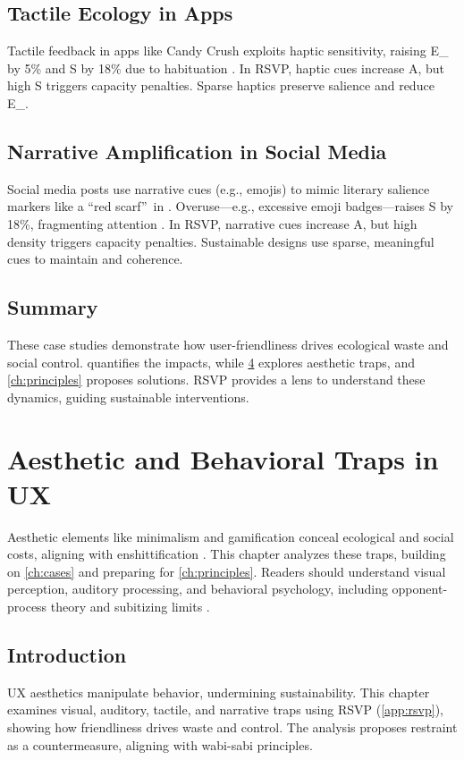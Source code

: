 \documentclass[openany]{book}
\newcommand{\PhiS}{\Phi} %
\newcommand{\Sent}{S} %
\newcommand{\Eint}{E_{\mathrm{int}}} %
\begin{document}
\section{Tactile Ecology in Apps}
\label{sec:cases-tactile}
Tactile feedback in apps like Candy Crush exploits haptic sensitivity, raising \Eint{} by 5\% and \Sent{} by 18\% due to habituation \citep{gallace2006}. In RSVP, haptic cues increase A, but high \Sent{} triggers capacity penalties. Sparse haptics preserve salience and reduce \Eint{}.

\section{Narrative Amplification in Social Media}
\label{sec:cases-narrative}
Social media posts use narrative cues (e.g., emojis) to mimic literary salience markers like a \textquotedblleft red scarf\textquotedblright\ in \citet{lewis1942}. Overuse---e.g., excessive emoji badges---raises \Sent{} by 18\%, fragmenting attention \citep{colak2024}. In RSVP, narrative cues increase A, but high density triggers capacity penalties. Sustainable designs use sparse, meaningful cues to maintain \PhiS{} and coherence.

\section{Summary}
These case studies demonstrate how user-friendliness drives ecological waste and social control.  quantifies the impacts, while \cref{ch:aesthetic} explores aesthetic traps, and \cref{ch:principles} proposes solutions. RSVP provides a lens to understand these dynamics, guiding sustainable interventions.

\chapter{Aesthetic and Behavioral Traps in UX}
\label{ch:aesthetic}

Aesthetic elements like minimalism and gamification conceal ecological and social costs, aligning with enshittification \citep{doctorow2022}. This chapter analyzes these traps, building on \cref{ch:cases} and preparing for \cref{ch:principles}. Readers should understand visual perception, auditory processing, and behavioral psychology, including opponent-process theory \citep{hurvich1981} and subitizing limits \citep{kaufman1949}.

\section{Introduction}
\label{sec:aesthetic-intro}
UX aesthetics manipulate behavior, undermining sustainability. This chapter examines visual, auditory, tactile, and narrative traps using RSVP (\cref{app:rsvp}), showing how friendliness drives waste and control. The analysis proposes restraint as a countermeasure, aligning with wabi-sabi principles.
\end{document}
